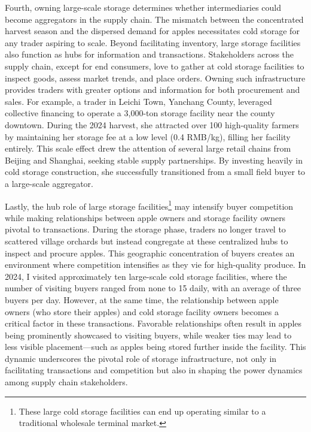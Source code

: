 Fourth, owning large-scale storage determines whether intermediaries could become aggregators in the supply chain. The mismatch between the concentrated harvest season and the dispersed demand for apples necessitates cold storage for any trader aspiring to scale. Beyond facilitating inventory, large storage facilities also function as hubs for information and transactions. Stakeholders across the supply chain, except for end consumers, love to gather at cold storage facilities to inspect goods, assess market trends, and place orders. Owning such infrastructure provides traders with greater options and information for both procurement and sales. For example, a trader in Leichi Town, Yanchang County, leveraged collective financing to operate a 3,000-ton storage facility near the county downtown. During the 2024 harvest, she attracted over 100 high-quality farmers by maintaining her storage fee at a low level (0.4 RMB/kg), filling her facility entirely. This scale effect drew the attention of several large retail chains from Beijing and Shanghai, seeking stable supply partnerships. By investing heavily in cold storage construction, she successfully transitioned from a small field buyer to a large-scale aggregator.



Lastly, the hub role of large storage facilities\footnote{These large cold storage facilities can end up operating similar to a traditional wholesale terminal market.} may intensify buyer competition while making relationships between apple owners and storage facility owners pivotal to transactions. During the storage phase, traders no longer travel to scattered village orchards but instead congregate at these centralized hubs to inspect and procure apples. This geographic concentration of buyers creates an environment where competition intensifies as they vie for high-quality produce. In 2024, I visited approximately ten large-scale cold storage facilities, where the number of visiting buyers ranged from none to 15 daily, with an average of three buyers per day. However, at the same time, the relationship between apple owners (who store their apples) and cold storage facility owners becomes a critical factor in these transactions. Favorable relationships often result in apples being prominently showcased to visiting buyers, while weaker ties may lead to less visible placement—such as apples being stored further inside the facility. This dynamic underscores the pivotal role of storage infrastructure, not only in facilitating transactions and competition but also in shaping the power dynamics among supply chain stakeholders.



